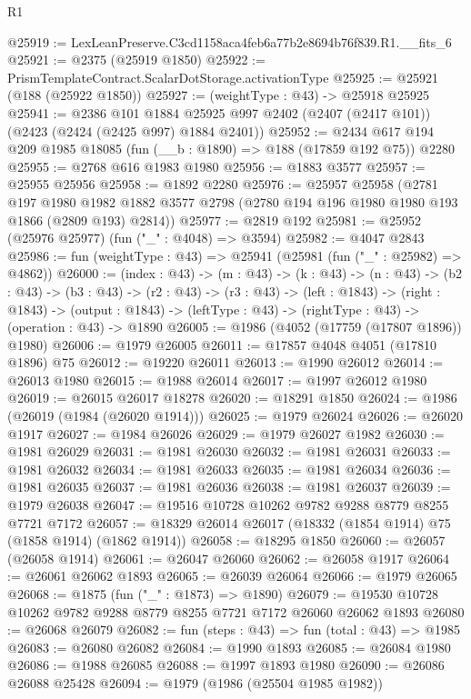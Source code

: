 \begin{lexlean}{R1}
\begin{coremodule}
@25919 := LexLeanPreserve.C3cd1158aca4feb6a77b2e8694b76f839.R1.__fits_6
@25921 := @2375 (@25919 @1850)
@25922 := PrismTemplateContract.ScalarDotStorage.activationType
@25925 := @25921 (@188 (@25922 @1850))
@25927 := (weightType : @43) -> @25918 @25925
@25941 := @2386
    @101
    @1884
    @25925
    @997
    @2402
    (@2407 (@2417 @101))
    (@2423 (@2424 (@2425 @997) @1884 @2401))
@25952 := @2434 @617 @194 @209 @1985 @18085 (fun (__b : @1890) => @188 (@17859 @192 @75)) @2280
@25955 := @2768 @616 @1983 @1980
@25956 := @1883 @3577
@25957 := @25955 @25956
@25958 := @1892 @2280
@25976 := @25957
    @25958
    (@2781
      @197
      @1980
      @1982
      @1882
      @3577
      @2798
      (@2780 @194 @196 @1980 @1980 @193 @1866 (@2809 @193) @2814))
@25977 := @2819 @192
@25981 := @25952 (@25976 @25977) (fun ("_" : @4048) => @3594)
@25982 := @4047 @2843
@25986 := fun (weightType : @43) => @25941 (@25981 (fun ("_" : @25982) => @4862))
@26000 := (index : @43) ->
  (m : @43) ->
  (k : @43) ->
  (n : @43) ->
  (b2 : @43) ->
  (b3 : @43) ->
  (r2 : @43) ->
  (r3 : @43) ->
  (left : @1843) ->
  (right : @1843) ->
  (output : @1843) -> (leftType : @43) -> (rightType : @43) -> (operation : @43) -> @1890
@26005 := @1986 (@4052 (@17759 (@17807 @1896)) @1980)
@26006 := @1979 @26005
@26011 := @17857 @4048 @4051 (@17810 @1896) @75
@26012 := @19220 @26011
@26013 := @1990 @26012
@26014 := @26013 @1980
@26015 := @1988 @26014
@26017 := @1997 @26012 @1980
@26019 := @26015 @26017 @18278
@26020 := @18291 @1850
@26024 := @1986 (@26019 (@1984 (@26020 @1914)))
@26025 := @1979 @26024
@26026 := @26020 @1917
@26027 := @1984 @26026
@26029 := @1979 @26027 @1982
@26030 := @1981 @26029
@26031 := @1981 @26030
@26032 := @1981 @26031
@26033 := @1981 @26032
@26034 := @1981 @26033
@26035 := @1981 @26034
@26036 := @1981 @26035
@26037 := @1981 @26036
@26038 := @1981 @26037
@26039 := @1979 @26038
@26047 := @19516 @10728 @10262 @9782 @9288 @8779 @8255 @7721 @7172
@26057 := @18329 @26014 @26017 (@18332 (@1854 @1914) @75 (@1858 @1914) (@1862 @1914))
@26058 := @18295 @1850
@26060 := @26057 (@26058 @1914)
@26061 := @26047 @26060
@26062 := @26058 @1917
@26064 := @26061 @26062 @1893
@26065 := @26039 @26064
@26066 := @1979 @26065
@26068 := @1875 (fun ("_" : @1873) => @1890)
@26079 := @19530 @10728 @10262 @9782 @9288 @8779 @8255 @7721 @7172 @26060 @26062 @1893
@26080 := @26068 @26079
@26082 := fun (steps : @43) => fun (total : @43) => @1985
@26083 := @26080 @26082
@26084 := @1990 @1893
@26085 := @26084 @1980
@26086 := @1988 @26085
@26088 := @1997 @1893 @1980
@26090 := @26086 @26088 @25428
@26094 := @1979 (@1986 (@25504 @1985 @1982))

\end{coremodule}
\end{lexlean}
